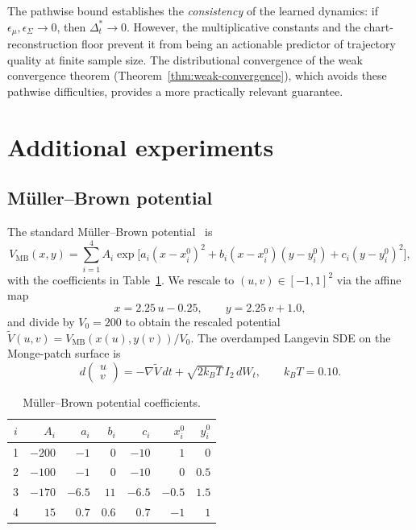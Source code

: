 \documentclass[11pt]{article}
\begin{document}
The pathwise bound establishes the \emph{consistency} of the
learned dynamics: if $\epsilon_\mu,\epsilon_\Sigma\to 0$,
then $\Delta_t^*\to 0$. However, the multiplicative constants and the
chart-reconstruction floor prevent it from being an actionable
predictor of trajectory quality at finite sample size.
The distributional convergence of
the weak convergence theorem (Theorem~\ref{thm:weak-convergence}), which avoids these pathwise
difficulties, provides a more practically relevant guarantee.

\section{Additional experiments}\label{app:supp-experiments}

\subsection{M\"uller--Brown potential}\label{app:mb-coeffs}

The standard M\"uller--Brown potential~\cite{MullerBrown1979} is
\[
  V_{\mathrm{MB}}(x,y)
  = \sum_{i=1}^{4} A_i
    \exp\!\bigl[a_i(x-x_i^0)^2
      + b_i(x-x_i^0)(y-y_i^0)
      + c_i(y-y_i^0)^2\bigr],
\]
with the coefficients in Table~\ref{tab:mb_coeffs}.
We rescale to $(u,v)\in[-1,1]^2$ via the affine map
\[
  x = 2.25\,u - 0.25, \qquad y = 2.25\,v + 1.0,
\]
and divide by $V_0=200$ to obtain the rescaled potential
$\tilde V(u,v)=V_{\mathrm{MB}}(x(u),y(v))/V_0$.
The overdamped Langevin SDE on the Monge-patch surface is
\[
  d\begin{pmatrix}u\\v\end{pmatrix}
  = -\nabla\tilde V\,dt
  + \sqrt{2k_BT}\,I_2\,dW_t,
  \qquad k_BT = 0.10.
\]

\begin{table}[ht]
\centering
\caption{M\"uller--Brown potential coefficients.}
\label{tab:mb_coeffs}
\small
\begin{tabular}{crrrrrr}
\toprule
$i$ & $A_i$ & $a_i$ & $b_i$ & $c_i$ & $x_i^0$ & $y_i^0$ \\
\midrule
1 & $-200$ & $-1$   & $0$  & $-10$  & $1$    & $0$ \\
2 & $-100$ & $-1$   & $0$  & $-10$  & $0$    & $0.5$ \\
3 & $-170$ & $-6.5$ & $11$ & $-6.5$ & $-0.5$ & $1.5$ \\
4 & $15$   & $0.7$  & $0.6$& $0.7$  & $-1$   & $1$ \\
\bottomrule
\end{tabular}
\end{table}
\end{document}
